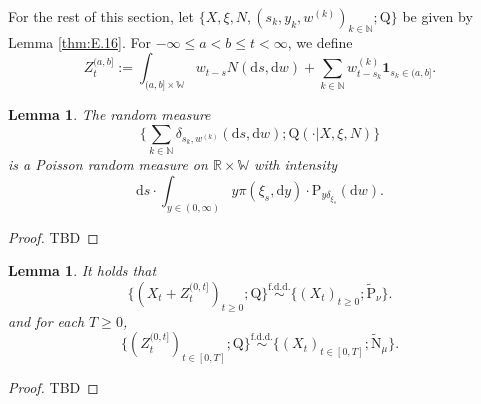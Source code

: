 \documentclass[12pt,a4paper]{amsart}
\numberwithin{equation}{section}
\theoremstyle{plain}
\newtheorem{lem}[thm]{Lemma}
\theoremstyle{definition}
\theoremstyle{remark}
\begin{document}
	For the rest of this section, let $\big\{X, \xi, N, (s_k, y_k,w^{(k)})_{k\in \mathbb N}; \mathrm Q\big\}$ be given by Lemma \ref{thm:E.16}.
	For $-\infty \leq a < b \leq t<\infty$, we define
\begin{equation} \label{eq:E.4}
	Z_t^{(a,b]}:= \int_{(a,b]\times \mathbb W} w_{t-s} N(\mathrm ds,\mathrm dw) + \sum_{k\in \mathbb N} w^{(k)}_{t-s_k} \mathbf 1_{s_k \in (a,b]}.
\end{equation}
\begin{lem} \label{thm:E.19}
	The random measure
\[
	\Big\{\sum_{k\in \mathbb N} \delta_{s_k, w^{(k)}}(\mathrm ds,\mathrm dw); \mathrm Q(\cdot | X, \xi, N)\Big\}
\]
	is a Poisson random measure on $\mathbb R \times \mathbb W$ with intensity
\[
	\mathrm ds \cdot \int_{y\in (0,\infty)} y \pi(\xi_s, \mathrm dy)\cdot \mathrm P_{y\delta_{\xi_s}}(\mathrm dw).
\]
\end{lem}
\begin{proof}
	TBD
\end{proof}
\begin{lem}\label{thm:E.2}
	It holds that
\[
	\{(X_t + Z_t^{(0,t]})_{t\geq 0}; \mathrm Q\} \overset{\text{f.d.d.}}\sim \{(X_t)_{t\geq 0}; \widetilde{\mathrm P}_\nu\}.
\]
	and for each $T\geq 0$,
\[
	\{(Z_t^{(0,t]})_{t\in [0,T]}; \mathrm Q\} \overset{\text{f.d.d.}} \sim \big\{ (X_t)_{t\in [0,T]}; \widetilde{\mathrm N}_\mu\big\}.
\]
\end{lem}

\begin{proof}
	TBD
\end{proof}
\end{document}
